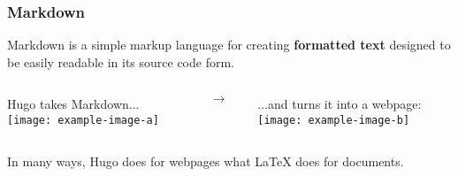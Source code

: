 \begin{frame}
    \frametitle{Markdown}

    Markdown is a simple markup language for creating \textbf{formatted text} designed to be easily readable in
    its source code form.
    \bigskip

    \pause
    \begin{columns}
        \begin{column}{.45\textwidth}
            Hugo takes Markdown... \ \\
            \bigskip
            \texttt{[image: example-image-a]}
        \end{column}
        \pause
        \begin{column}{.1\textwidth}
            $$ \to $$
        \end{column}
        \begin{column}{.45\textwidth}
            ...and turns it into a webpage: \ \\
            \bigskip
            \texttt{[image: example-image-b]}
        \end{column}
    \end{columns}

    \pause
    \vfill

    In many ways, Hugo does for webpages what \LaTeX \: does for documents.
    
\end{frame}